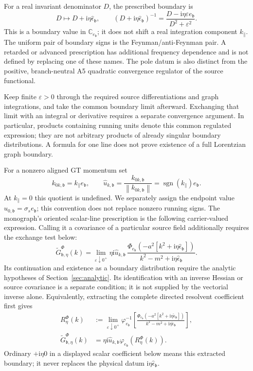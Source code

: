 \documentclass[final,5p,times,twocolumn,numbers,nopreprintline]{elsarticle}
\numberwithin{equation}{section}
\theoremstyle{definition}
\theoremstyle{remark}
\newcommand{\ii}{\mathrm i}
\newcommand{\bb}{\mathfrak b}
\newcommand{\Ph}{\Phi}
\newcommand{\sgn}{\operatorname{sgn}}
\newcommand{\CC}{\mathbb C}
\newcommand{\norm}[1]{\left\lVert #1\right\rVert}
\newcommand{\ee}{e_{\bb}}
\newcommand{\epsvec}{\hat\epsilon_{\bb}}
\newcommand{\embed}{\varphi_{\ee}}
\begin{document}
For a real invariant denominator \(D\), the prescribed boundary is
\begin{equation}
 D\longmapsto D+\ii\eta\epsvec,
 \qquad
 (D+\ii\eta\epsvec)^{-1}
   =\frac{D-\ii\eta\varepsilon\ee}{D^2+\varepsilon^2}.
 \label{eq:directed-inverse}
\end{equation}
This is a boundary value in \(\CC_{\ee}\); it does not shift a
real integration component \(k_\parallel\). The uniform pair of
boundary signs is the Feynman/anti-Feynman pair. A retarded or
advanced prescription has additional frequency dependence and is
not defined by replacing one of these names. The pole datum is also
distinct from the positive, branch-neutral A5 quadratic convergence
regulator of the source functional.

Keep finite \(\varepsilon>0\) through the required source
differentiations and graph integrations, and take the common boundary
limit afterward. Exchanging that limit with an integral or derivative
requires a separate convergence argument. In particular, products
containing running units denote this common regulated expression;
they are not arbitrary products of already singular boundary
distributions. A formula for one line does not prove existence of a
full Lorentzian graph boundary.

For a nonzero aligned GT momentum set
\begin{equation}
 k_{0k,\bb}=k_\parallel\ee,\qquad
 \widehat u_{k,\bb}
  =\frac{k_{0k,\bb}}{\norm{k_{0k,\bb}}}
  =\sgn(k_\parallel)\ee.
 \label{eq:running-carrier}
\end{equation}
At \(k_\parallel=0\) this quotient is undefined. We separately
assign the endpoint value \(\widehat u_{0,\bb}=\sigma_s\ee\);
this convention does not replace nonzero running signs. The
monograph's oriented scalar-line prescription is the following
carrier-valued expression. Calling it a covariance of a particular
source field additionally requires the exchange test below:
\begin{equation}
 \widetilde G^\Ph_{\bb,\eta}(k)
 =\lim_{\varepsilon\downarrow0^+}
 \eta\ii\widehat u_{k,\bb}\,
 \frac{\Ph_{\ee}\!\left(-a^2[k^2+\ii\eta\epsvec]\right)}
      {k^2-m^2+\ii\eta\epsvec}.
 \label{eq:directed-propagator}
\end{equation}
Its continuation and existence as a boundary distribution require
the analytic hypotheses of Section~\ref{sec:analytic}. Its identification
with an inverse Hessian or source covariance is a separate condition;
it is not supplied by the vectorial inverse alone. Equivalently, extracting
the complete directed resolvent coefficient first gives
\begin{align}
 R_\eta^\Ph(k)
  &:=\lim_{\varepsilon\downarrow0^+}\embed^{-1}\!\left[
  \frac{\Ph_{\ee}(-a^2[k^2+\ii\eta\epsvec])}
       {k^2-m^2+\ii\eta\epsvec}\right],\nonumber\\
 \widetilde G^\Ph_{\bb,\eta}(k)
  &=\eta\ii\widehat u_{k,\bb}\embed(R_\eta^\Ph(k)).
 \label{eq:scalar-line-coefficient}
\end{align}
Ordinary \(+\ii\eta0\) in a displayed scalar coefficient below
means this extracted boundary; it never replaces the physical
datum \(\ii\eta\epsvec\).
\end{document}
